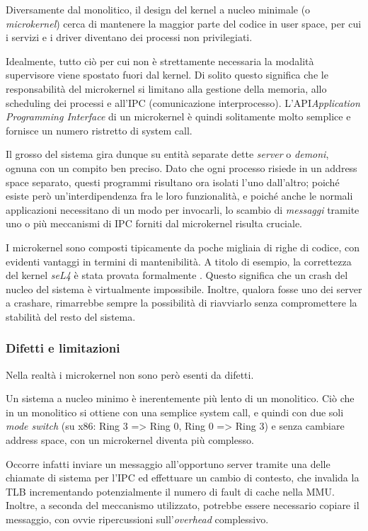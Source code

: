 \documentclass[12pt,a4paper]{report}
\begin{document}
			Diversamente dal monolitico, il design del kernel a nucleo minimale (o \emph{microkernel}) cerca di
			mantenere la maggior parte del codice in user space, per cui i servizi e i driver diventano dei processi non privilegiati.
			
			Idealmente, tutto ciò per cui non è strettamente necessaria la modalità supervisore viene spostato fuori dal
			kernel. Di solito questo significa che le responsabilità del microkernel si limitano alla gestione della memoria,
			allo scheduling dei processi e all'IPC (comunicazione interprocesso). L'API\emph{Application Programming Interface}
			di un microkernel è quindi solitamente molto semplice e fornisce un numero ristretto di system call.
			
			Il grosso del sistema gira dunque su entità separate dette \emph{server} o \emph{demoni}, ognuna con un
			compito ben preciso. Dato che ogni processo risiede in un address space separato, questi programmi
			risultano ora isolati l'uno dall'altro; poiché esiste però un'interdipendenza fra le loro funzionalità, e poiché
			anche le normali applicazioni necessitano di un modo per invocarli, lo scambio di \emph{messaggi}
			tramite uno o più meccanismi di IPC forniti dal microkernel risulta cruciale.
			
			I microkernel sono composti tipicamente da poche migliaia di righe di codice, con evidenti vantaggi
			in termini di mantenibilità. A titolo di esempio, la correttezza del kernel \emph{seL4} è stata provata
			formalmente \cite{Klein}.
			Questo significa che un crash del nucleo del sistema è virtualmente impossibile. Inoltre, qualora
			fosse uno dei server a crashare, rimarrebbe sempre la possibilità di riavviarlo senza compromettere
			la stabilità del resto del sistema.
			
			\subsubsection{Difetti e limitazioni}
				Nella realtà i microkernel non sono però esenti da difetti.
				
				Un sistema a nucleo minimo è inerentemente più lento di un monolitico. Ciò che in un monolitico
				si ottiene con una semplice system call, e quindi con due soli \emph{mode switch}
				(su x86: Ring 3 => Ring 0, Ring 0 => Ring 3) e senza cambiare address space, con un microkernel
				diventa più complesso.
				
				Occorre infatti inviare un messaggio all'opportuno server tramite una delle chiamate di sistema
				per l'IPC ed effettuare un cambio di contesto, che invalida la TLB incrementando potenzialmente
				il numero di fault di cache nella MMU. Inoltre, a seconda del meccanismo utilizzato, potrebbe
				essere necessario copiare il messaggio, con ovvie ripercussioni sull'\emph{overhead} complessivo.			
				
\end{document}
